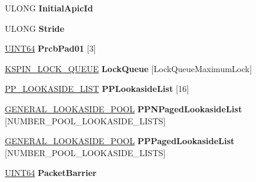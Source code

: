 \begin{DoxyCompactItemize}
\item 
\mbox{\label{struct___k_p_r_c_b_ac04d36f5c9427792ed57da22be033a74}} 
U\+L\+O\+NG {\bfseries Initial\+Apic\+Id}
\item 
\mbox{\label{struct___k_p_r_c_b_a1abfe4c7c85f97a1d15fdafac77f5d53}} 
U\+L\+O\+NG {\bfseries Stride}
\item 
\mbox{\label{struct___k_p_r_c_b_aed0e44c705e41c8c5f022a0ad0ff69aa}} 
\hyperlink{_processor_bind_8h_a57be03562867144161c1bfee95ca8f7c}{U\+I\+N\+T64} {\bfseries Prcb\+Pad01} \mbox{[}3\mbox{]}
\item 
\mbox{\label{struct___k_p_r_c_b_a100a4301c38592b3459d0e028c576412}} 
\hyperlink{struct___k_s_p_i_n___l_o_c_k___q_u_e_u_e}{K\+S\+P\+I\+N\+\_\+\+L\+O\+C\+K\+\_\+\+Q\+U\+E\+UE} {\bfseries Lock\+Queue} \mbox{[}Lock\+Queue\+Maximum\+Lock\mbox{]}
\item 
\mbox{\label{struct___k_p_r_c_b_a80cf6fb7884f431567bd5fbdc26d3df1}} 
\hyperlink{struct___p_p___l_o_o_k_a_s_i_d_e___l_i_s_t}{P\+P\+\_\+\+L\+O\+O\+K\+A\+S\+I\+D\+E\+\_\+\+L\+I\+ST} {\bfseries P\+P\+Lookaside\+List} \mbox{[}16\mbox{]}
\item 
\mbox{\label{struct___k_p_r_c_b_a1b54b2819868be1783155999c349583a}} 
\hyperlink{struct___g_e_n_e_r_a_l___l_o_o_k_a_s_i_d_e___p_o_o_l}{G\+E\+N\+E\+R\+A\+L\+\_\+\+L\+O\+O\+K\+A\+S\+I\+D\+E\+\_\+\+P\+O\+OL} {\bfseries P\+P\+N\+Paged\+Lookaside\+List} \mbox{[}N\+U\+M\+B\+E\+R\+\_\+\+P\+O\+O\+L\+\_\+\+L\+O\+O\+K\+A\+S\+I\+D\+E\+\_\+\+L\+I\+S\+TS\mbox{]}
\item 
\mbox{\label{struct___k_p_r_c_b_a5804fcbc566ebb5150afb88cdb5f5cb4}} 
\hyperlink{struct___g_e_n_e_r_a_l___l_o_o_k_a_s_i_d_e___p_o_o_l}{G\+E\+N\+E\+R\+A\+L\+\_\+\+L\+O\+O\+K\+A\+S\+I\+D\+E\+\_\+\+P\+O\+OL} {\bfseries P\+P\+Paged\+Lookaside\+List} \mbox{[}N\+U\+M\+B\+E\+R\+\_\+\+P\+O\+O\+L\+\_\+\+L\+O\+O\+K\+A\+S\+I\+D\+E\+\_\+\+L\+I\+S\+TS\mbox{]}
\item 
\mbox{\label{struct___k_p_r_c_b_a69638e1ada99bf4a3629d4bf3b2ed53c}} 
\hyperlink{_processor_bind_8h_a57be03562867144161c1bfee95ca8f7c}{U\+I\+N\+T64} {\bfseries Packet\+Barrier}

\end{DoxyCompactItemize}
